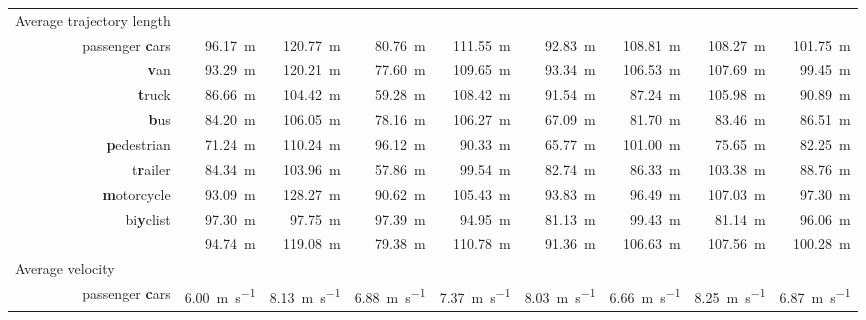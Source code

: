 \documentclass[a4paper, 10pt, conference]{ieeeconf}      %
\begin{document}
\begin{table}[t]
\begin{center}
\begin{tabular}{r|r|r|r|r|r|r|r||r}
    \multicolumn{1}{l|}{Average trajectory length} & & & & & & & & \\
    passenger \textbf{c}ars & \SI{96,17}{\meter} & \SI{120,77}{\meter} & \SI{80,76}{\meter} & \SI{111,55}{\meter} & \SI{92,83}{\meter} & \SI{108,81}{\meter} & \SI{108,27}{\meter} & \SI{101,75}{\meter} \\
                \textbf{v}an & \SI{93,29}{\meter} & \SI{120,21}{\meter} & \SI{77,60}{\meter} & \SI{109,65}{\meter} & \SI{93,34}{\meter} & \SI{106,53}{\meter} & \SI{107,69}{\meter} & \SI{99,45}{\meter} \\
            \textbf{t}ruck & \SI{86,66}{\meter} & \SI{104,42}{\meter} & \SI{59,28}{\meter} & \SI{108,42}{\meter} & \SI{91,54}{\meter} & \SI{87,24}{\meter} & \SI{105,98}{\meter} & \SI{90,89}{\meter} \\
                \textbf{b}us & \SI{84,20}{\meter} & \SI{106,05}{\meter} & \SI{78,16}{\meter} & \SI{106,27}{\meter} & \SI{67,09}{\meter} & \SI{81,70}{\meter} & \SI{83,46}{\meter} & \SI{86,51}{\meter} \\
        \textbf{p}edestrian & \SI{71,24}{\meter} & \SI{110,24}{\meter} & \SI{96,12}{\meter} & \SI{90,33}{\meter} & \SI{65,77}{\meter} & \SI{101,00}{\meter} & \SI{75,65}{\meter} & \SI{82,25}{\meter} \\
            t\textbf{r}ailer & \SI{84,34}{\meter} & \SI{103,96}{\meter} & \SI{57,86}{\meter} & \SI{99,54}{\meter} & \SI{82,74}{\meter} & \SI{86,33}{\meter} & \SI{103,38}{\meter} & \SI{88,76}{\meter} \\
        \textbf{m}otorcycle & \SI{93,09}{\meter} & \SI{128,27}{\meter} & \SI{90,62}{\meter} & \SI{105,43}{\meter} & \SI{93,83}{\meter} & \SI{96,49}{\meter} & \SI{107,03}{\meter} & \SI{97,30}{\meter} \\
        bi\textbf{y}clist & \SI{97,30}{\meter} & \SI{97,75}{\meter} & \SI{97,39}{\meter} & \SI{94,95}{\meter} & \SI{81,13}{\meter} & \SI{99,43}{\meter} & \SI{81,14}{\meter} & \SI{96,06}{\meter} \\
    \hline
                    & \SI{94,74}{\meter} & \SI{119,08}{\meter} & \SI{79,38}{\meter} & \SI{110,78}{\meter} & \SI{91,36}{\meter} & \SI{106,63}{\meter} & \SI{107,56}{\meter} & \SI{100,28}{\meter} \\
                    \hline
                    \hline
    \multicolumn{1}{l|}{Average velocity} & & & & & & & & \\
    passenger \textbf{c}ars & \SI{6,00}{\meter\per\second} & \SI{8,13}{\meter\per\second} & \SI{6,88}{\meter\per\second} & \SI{7,37}{\meter\per\second} & \SI{8,03}{\meter\per\second} & \SI{6,66}{\meter\per\second} & \SI{8,25}{\meter\per\second} & \SI{6,87}{\meter\per\second} \\

\end{tabular}
\end{center}
\end{table}
\end{document}
